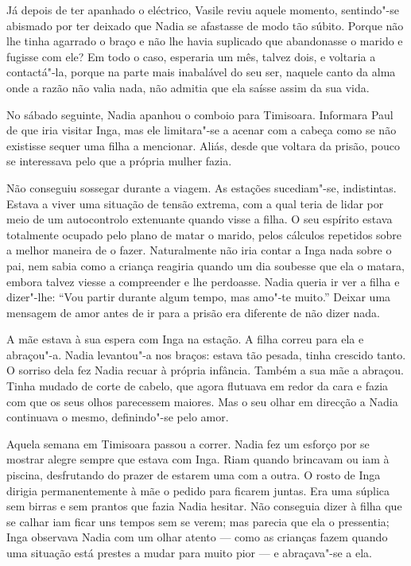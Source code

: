 Já depois de ter apanhado o eléctrico, Vasile reviu aquele momento,
sentindo"-se abismado por ter deixado que Nadia se afastasse de modo tão
súbito. Porque não lhe tinha agarrado o braço e não lhe havia suplicado
que abandonasse o marido e fugisse com ele? Em todo o caso, esperaria um
mês, talvez dois, e voltaria a contactá"-la,
porque na parte mais inabalável do seu ser, naquele canto da alma onde a
razão não valia nada, não admitia que ela saísse assim da sua vida.

\bigskip

No sábado seguinte, Nadia apanhou o comboio para Timisoara. Informara
Paul de que iria visitar Inga, mas ele limitara"-se a acenar com a cabeça
como se não existisse sequer uma filha a mencionar. Aliás, desde que
voltara da prisão, pouco se interessava pelo que a própria mulher fazia.

Não conseguiu sossegar durante a viagem. As estações sucediam"-se,
indistintas. Estava a viver uma situação de tensão extrema, com a qual
teria de lidar por meio de um autocontrolo extenuante quando visse a
filha. O seu espírito estava totalmente ocupado pelo plano de matar o
marido, pelos cálculos repetidos sobre a melhor maneira de o fazer.
Naturalmente não iria contar a Inga nada sobre o pai, nem sabia como a
criança reagiria quando um dia soubesse que ela o matara, embora talvez
viesse a compreender e lhe perdoasse. Nadia queria ir ver a filha e
dizer"-lhe: ``Vou partir durante algum tempo, mas amo"-te muito.'' Deixar
uma mensagem de amor antes de ir para a
prisão era diferente de não dizer nada.

A mãe estava à sua espera com Inga na estação. A filha correu para ela e
abraçou"-a. Nadia levantou"-a nos braços: estava tão pesada, tinha
crescido tanto. O sorriso dela fez Nadia recuar à própria infância.
Também a sua mãe a abraçou. Tinha mudado de corte de cabelo, que agora
flutuava em redor da cara e fazia com que os seus olhos parecessem
maiores. Mas o seu olhar em direcção a Nadia continuava o mesmo,
definindo"-se pelo amor.

Aquela semana em Timisoara passou a correr. Nadia fez um esforço por se
mostrar alegre sempre que estava com Inga. Riam quando brincavam ou iam
à piscina, desfrutando do prazer de estarem uma com a outra. O rosto
de Inga dirigia permanentemente à mãe o pedido para ficarem juntas.
Era uma súplica sem birras e sem prantos que fazia Nadia hesitar. Não
conseguia dizer à filha que se calhar iam ficar uns tempos sem se verem;
mas parecia que ela o pressentia; Inga observava Nadia com um olhar
atento --- como as crianças fazem quando uma situação está prestes a
mudar para muito pior --- e abraçava"-se a ela.

